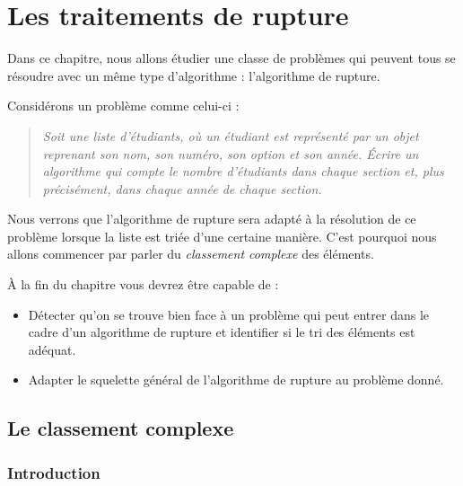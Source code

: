 \newcommand{\nivo}[1]{ {\color{colnivo}#1} }
\newcommand{\nivi}[1]{ {\color{colnivi}#1} }
\newcommand{\nivii}[1]{ {\color{colnivii}#1} }
\newcommand{\nivc}[1]{ {\color{colcalc}#1} }

\chapter{Les traitements de rupture}
\label{chap:rupture}

	Dans ce chapitre, nous allons étudier une classe de problèmes 
	qui peuvent tous se résoudre avec un même type d'algorithme :
	l'algorithme de rupture. 
	
	Considérons un problème comme celui-ci :
	\begin{quotation}
		\slshape
		\og{}Soit une liste d'étudiants, 
		où un étudiant est représenté par un objet reprenant son nom,
		son numéro, son option et son année.
		Écrire un algorithme qui compte le nombre d'étudiants dans chaque section
		et, plus précisément, dans chaque année de chaque section.\fg{}
	\end{quotation}
	
	Nous verrons que l'algorithme de rupture sera adapté à la résolution de
        ce problème lorsque la liste est triée d'une certaine manière.
	C'est pourquoi nous allons commencer par parler du \emph{classement complexe}
	des éléments.
	
	À la fin du chapitre vous
	devrez être capable de :	
	\begin{itemize}
		\item 
			Détecter qu'on se trouve bien face à un problème qui
			peut entrer dans le cadre d'un algorithme de rupture
			et identifier si le tri des éléments est adéquat.
		\item 
			Adapter le squelette général de l'algorithme de rupture
			au problème donné.
	\end{itemize}

\section{Le classement complexe}

\subsection*{Introduction}

